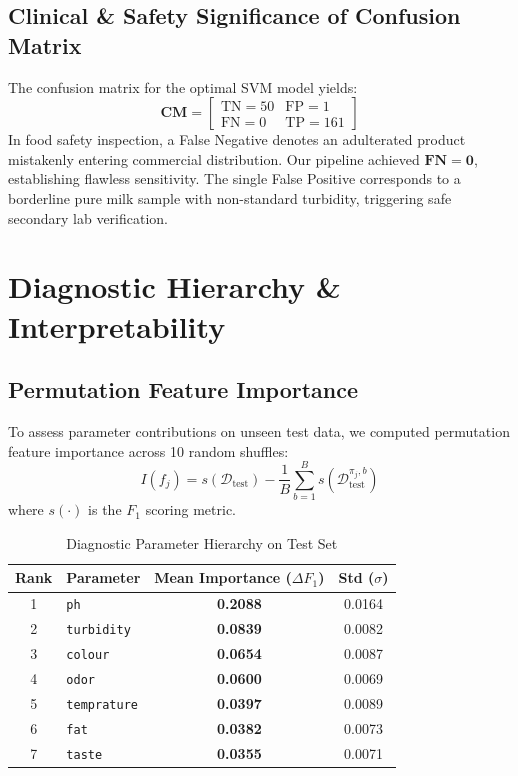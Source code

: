 \documentclass[conference]{IEEEtran}
\begin{document}
\subsection{Clinical \& Safety Significance of Confusion Matrix}
The confusion matrix for the optimal SVM model yields:
\begin{equation}
\mathbf{CM} = \begin{bmatrix} \text{TN}=50 & \text{FP}=1 \\ \text{FN}=0 & \text{TP}=161 \end{bmatrix}
\end{equation}
In food safety inspection, a False Negative denotes an adulterated product mistakenly entering commercial distribution. Our pipeline achieved $\mathbf{\text{FN} = 0}$, establishing flawless sensitivity. The single False Positive corresponds to a borderline pure milk sample with non-standard turbidity, triggering safe secondary lab verification.

\section{Diagnostic Hierarchy \& Interpretability}

\subsection{Permutation Feature Importance}
To assess parameter contributions on unseen test data, we computed permutation feature importance across 10 random shuffles:
\begin{equation}
I(f_j) = s(\mathcal{D}_{\text{test}}) - \frac{1}{B} \sum_{b=1}^B s(\mathcal{D}_{\text{test}}^{\pi_j, b})
\end{equation}
where $s(\cdot)$ is the $F_1$ scoring metric.

\begin{table}[htbp]
\caption{Diagnostic Parameter Hierarchy on Test Set}
\label{tab:feature_hierarchy}
\centering
\begin{tabular}{clcc}
\toprule
\textbf{Rank} & \textbf{Parameter} & \textbf{Mean Importance ($\Delta F_1$)} & \textbf{Std ($\sigma$)} \\
\midrule
1 & \texttt{ph} & \textbf{0.2088} & 0.0164 \\
2 & \texttt{turbidity} & \textbf{0.0839} & 0.0082 \\
3 & \texttt{colour} & \textbf{0.0654} & 0.0087 \\
4 & \texttt{odor} & \textbf{0.0600} & 0.0069 \\
5 & \texttt{temprature} & \textbf{0.0397} & 0.0089 \\
6 & \texttt{fat} & \textbf{0.0382} & 0.0073 \\
7 & \texttt{taste} & \textbf{0.0355} & 0.0071 \\
\bottomrule
\end{tabular}
\end{table}
\end{document}
